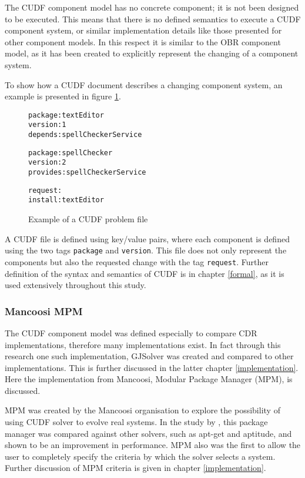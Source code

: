 The CUDF component model has no concrete component; it is not been designed to be executed.
This means that there is no defined semantics to execute a CUDF component system, or similar implementation details like those presented for other component models.
In this respect it is similar to the OBR component model, as it has been created to explicitly represent the changing of a component system.

To show how a CUDF document describes a changing component system, an example is presented in figure \ref{CUDFmetadata}.

\begin{figure}[htp] 
\begin{center}
\begin{alltt}
package: textEditor
version: 1
depends: spellCheckerService

package: spellChecker
version: 2
provides: spellCheckerService

request:
install:textEditor

\end{alltt}
  \caption[CUDF meta-data file]{Example of a CUDF problem file}
  \label{CUDFmetadata}
\end{center}
\end{figure}

A CUDF file is defined using key/value pairs, where each component is defined using the two tags \texttt{package} and \texttt{version}.
This file does not only represent the components but also the requested change with the tag \texttt{request}.
Further definition of the syntax and semantics of CUDF is in chapter \ref{formal}, as it is used extensively throughout this study.

\subsubsection{Mancoosi MPM}
The CUDF component model was defined especially to compare CDR implementations, therefore many implementations exist.
In fact through this research one such implementation, GJSolver was created and compared to other implementations.
This is further discussed in the latter chapter \ref{implementation}.
Here the implementation from Mancoosi, Modular Package Manager \citep{abate2011} (MPM), is discussed.

MPM was created by the Mancoosi organisation to explore the possibility of using CUDF solver to evolve real systems.
In the study by \cite{abate2011}, this package manager was compared against other solvers, such as apt-get and aptitude, and shown to be an improvement in performance.
MPM also was the first to allow the user to completely specify the criteria by which the solver selects a system.
Further discussion of MPM criteria is given in chapter \ref{implementation}. 


